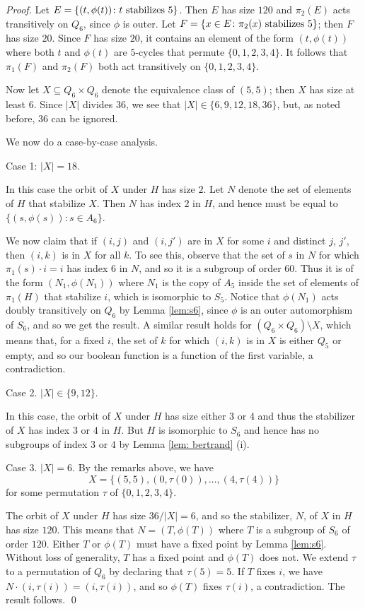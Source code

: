 \documentclass{llncs}
\begin{document}
\begin{proof}
Let $E = \{(t,\phi(t))\colon t {\rm ~stabilizes}~ 5\}$.  Then $E$ has size $120$ and $\pi_2(E)$ acts transitively on $Q_6$, since $\phi$ is outer.  Let $F=\{x \in E \colon \pi_2(x) {\rm ~stabilizes}~ 5\}$; then $F$ has size $20$. 
Since $F$ has size $20$, it contains an element of the form $(t,\phi(t))$ where both $t$ and $\phi(t)$ are $5$-cycles that permute $\{0,1,2,3,4\}$.  It follows that $\pi_1(F)$ and $\pi_2(F)$ both act transitively on $\{0,1,2,3,4\}$. 

Now let $X\subseteq Q_6\times Q_6$ denote the equivalence class of $(5,5)$; then $X$ has size at least $6$.  Since $|X|$ divides $36$, we see that $|X|\in \{6,9,12,18, 36\}$, but, as noted before, 36 can be ignored.  

We now do a case-by-case analysis.  

\item[Case 1: $|X| = 18$.]

In this case  the orbit of $X$ under $H$ has size $2$.  Let $N$ denote the set of elements of $H$ that stabilize $X$.  Then $N$ has index $2$ in $H$, and hence must be equal to $\{(s,\phi(s))\colon s \in A_6\}$.

We now claim that if  $(i,j)$ and $(i,j')$ are in $X$ for some $i$ and distinct $j$, $j'$, then $(i,k)$ is in $X$ for all $k$.  To see this, observe that the set of $s$ in $N$ for which $\pi_1(s)\cdot i=i$ has index $6$ in $N$, and so it is a subgroup of order $60$.  
Thus it is of the form $(N_1,\phi(N_1))$ where $N_1$ is the copy of $A_5$ inside the set of elements of $\pi_1(H)$ that stabilize $i$, which is isomorphic to $S_5$.   
Notice that $\phi(N_1)$ acts doubly transitively on $Q_6$ by Lemma \ref{lem:s6}, since $\phi$ is an outer automorphism of $S_6$, and so we get the result.  A similar result holds for $(Q_6 \times Q_6) \setminus X$, which means that, for a fixed $i$, the set of $k$ for which $(i,k)$ is in $X$ is either $Q_5$ or empty, and so our boolean function is a function of the first variable, a contradiction.

\item[Case 2. $|X|\in \{9,12\}$.]

In this case, the orbit of $X$ under $H$ has size either $3$ or $4$ and thus the stabilizer of $X$ has index $3$ or $4$ in $H$.  But $H$ is isomorphic to $S_6$ and hence has no subgroups of index $3$ or $4$ by Lemma \ref{lem: bertrand} (i).

\item[Case 3. $|X|=6$.]
By the remarks above, we have 
$$X=\{(5,5),(0,\tau(0)),\ldots ,(4,\tau(4))\}$$ for some permutation $\tau$ of $\{ 0,1,2,3,4\}.$

The orbit of $X$ under $H$ has size $36/|X| = 6$, and so the stabilizer, $N$, of $X$ in $H$ has size $120$.  This means  that $N = (T, \phi(T))$ where $T$ is a subgroup of $S_6$ of order $120$.  Either $T$ or $\phi(T)$ must have a fixed point by Lemma \ref{lem:s6}.  Without loss of generality, $T$ has a fixed point and $\phi(T)$ does not.  We extend $\tau$ to a permutation of $Q_6$ by declaring that $\tau(5)=5$.  If $T$ fixes $i$, we have $N\cdot (i,\tau(i)) = (i,\tau(i))$, and so $\phi(T)$ fixes $\tau(i)$, a contradiction.  The result follows.
\qed
\end{proof}
\end{document}
